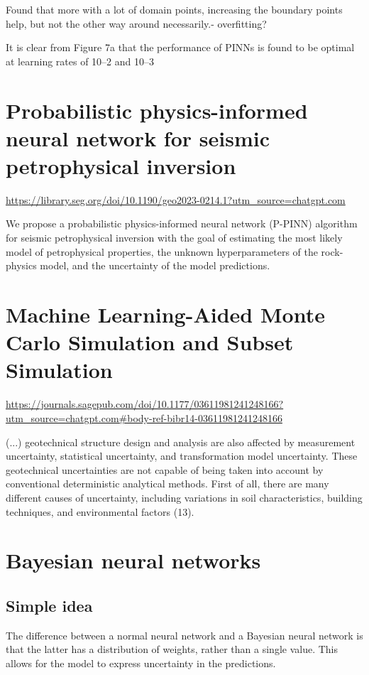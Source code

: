 Found that more with a lot of domain points, increasing the boundary points help, but not the other way around necessarily.- overfitting?

It is clear from Figure 7a that the performance of
PINNs is found to be optimal at learning rates of 10–2 and 10–3

\section{Probabilistic physics-informed neural network for seismic petrophysical inversion}

\url{https://library.seg.org/doi/10.1190/geo2023-0214.1?utm_source=chatgpt.com}

We propose a probabilistic physics-informed neural network (P-PINN) algorithm for seismic petrophysical inversion with the goal of estimating the most likely model of petrophysical properties, the unknown hyperparameters of the rock-physics model, and the uncertainty of the model predictions.


\section{Machine Learning-Aided Monte Carlo Simulation and Subset Simulation}

\url{https://journals.sagepub.com/doi/10.1177/03611981241248166?utm_source=chatgpt.com#body-ref-bibr14-03611981241248166}

(...) geotechnical structure design and analysis are also affected by measurement uncertainty, statistical uncertainty, and transformation model uncertainty. These geotechnical uncertainties are not capable of being taken into account by conventional deterministic analytical methods. First of all, there are many different causes of uncertainty, including variations in soil characteristics, building techniques, and environmental factors (13).

\section{Bayesian neural networks}

\subsection{Simple idea}

The difference between a normal neural network and a Bayesian neural network is that the latter has a distribution of weights, rather than a single value. This allows for the model to express uncertainty in the predictions.

